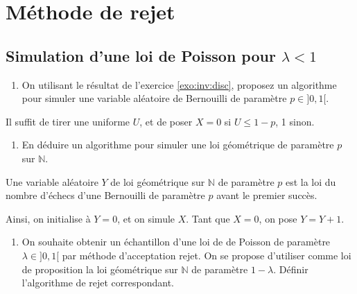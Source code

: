 \documentclass[
]{article}
\providecommand{\tightlist}{%
  \setlength{\itemsep}{0pt}\setlength{\parskip}{0pt}}
\newenvironment{Correction}%
  { \vspace{\baselineskip}\begin{mdframed}[backgroundcolor=my_green]}%
  {\end{mdframed}}
\begin{document}
\hypertarget{muxe9thode-de-rejet}{%
\section{Méthode de rejet}\label{muxe9thode-de-rejet}}

\hypertarget{simulation-dune-loi-de-poisson-pour-lambda-1}{%
\subsection{\texorpdfstring{Simulation d'une loi de Poisson pour
\(\lambda < 1\)}{Simulation d'une loi de Poisson pour \textbackslash lambda \textless{} 1}}\label{simulation-dune-loi-de-poisson-pour-lambda-1}}

\begin{enumerate}
\def\labelenumi{\arabic{enumi}.}
\tightlist
\item
  On utilisant le résultat de l'exercice \ref{exo:inv:disc}, proposez un
  algorithme pour simuler une variable aléatoire de Bernouilli de
  paramètre \(p \in ]0, 1[\).
\end{enumerate}

\begin{Correction}

Il suffit de tirer une uniforme $U$, et de poser $X = 0$ si $U \leq 1 - p$, 1 sinon.

\end{Correction}

\begin{enumerate}
\def\labelenumi{\arabic{enumi}.}
\setcounter{enumi}{1}
\tightlist
\item
  En déduire un algorithme pour simuler une loi géométrique de paramètre
  \(p\) sur \(\mathbb{N}\).
\end{enumerate}

\begin{Correction}

Une variable aléatoire $Y$ de loi géométrique sur $\mathbb{N}$  de paramètre $p$ est la loi du nombre d'échecs d'une Bernouilli de paramètre $p$ avant le premier succès.

Ainsi, on initialise à $Y = 0$, et on simule $X$. Tant que $X = 0$, on pose $Y = Y +1$.

\end{Correction}

\begin{enumerate}
\def\labelenumi{\arabic{enumi}.}
\setcounter{enumi}{2}
\tightlist
\item
  On souhaite obtenir un échantillon d'une loi de de Poisson de
  paramètre \(\lambda \in ]0, 1[\) par méthode d'acceptation rejet. On
  se propose d'utiliser comme loi de proposition la loi géométrique sur
  \(\mathbb{N}\) de paramètre \(1 - \lambda\). Définir l'algorithme de
  rejet correspondant.
\end{enumerate}
\end{document}
